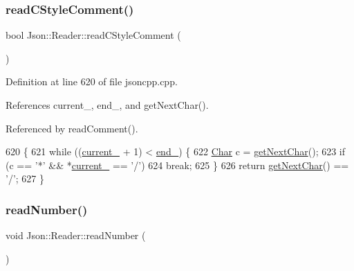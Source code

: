 \subsubsection{\texorpdfstring{read\+C\+Style\+Comment()}{readCStyleComment()}}
{\footnotesize\ttfamily bool Json\+::\+Reader\+::read\+C\+Style\+Comment (\begin{DoxyParamCaption}{ }\end{DoxyParamCaption})\hspace{0.3cm}{\ttfamily [private]}}



Definition at line 620 of file jsoncpp.\+cpp.



References current\+\_\+, end\+\_\+, and get\+Next\+Char().



Referenced by read\+Comment().


\begin{DoxyCode}
620                                \{
621   \textcolor{keywordflow}{while} ((\hyperlink{class_json_1_1_reader_a2f2feb5201a26da7aa133d2f7434479b}{current\_} + 1) < \hyperlink{class_json_1_1_reader_a714793579cbf4ee7c5a7223d2c8d77c1}{end\_}) \{
622     \hyperlink{class_json_1_1_reader_a3eec9118f3e9a672ba8348c3a79d0f45}{Char} c = \hyperlink{class_json_1_1_reader_ab61eb61333cc9ec3afe785663a53ce90}{getNextChar}();
623     \textcolor{keywordflow}{if} (c == \textcolor{charliteral}{'*'} && *\hyperlink{class_json_1_1_reader_a2f2feb5201a26da7aa133d2f7434479b}{current\_} == \textcolor{charliteral}{'/'})
624       \textcolor{keywordflow}{break};
625   \}
626   \textcolor{keywordflow}{return} \hyperlink{class_json_1_1_reader_ab61eb61333cc9ec3afe785663a53ce90}{getNextChar}() == \textcolor{charliteral}{'/'};
627 \}
\end{DoxyCode}
\mbox{\label{class_json_1_1_reader_afb31bfda6bb27d6453057a47655e8363}} 
\subsubsection{\texorpdfstring{read\+Number()}{readNumber()}}
{\footnotesize\ttfamily void Json\+::\+Reader\+::read\+Number (\begin{DoxyParamCaption}{ }\end{DoxyParamCaption})\hspace{0.3cm}{\ttfamily [private]}}



